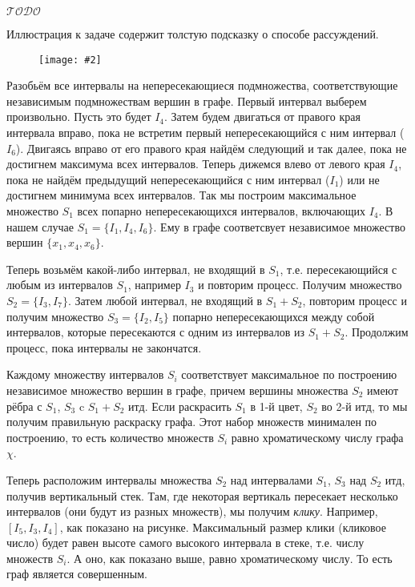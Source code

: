 \documentclass[a4paper,12pt]{article}
\numberwithin{figure}{section}
\def\TODO{\guillemotleft$\mathcal{TODO}$\guillemotright\textellipsis}
\newcommand\CenterFigure[2]{
	\begin{figure}[H]
		\centering
		\texttt{[image: \#2]}
	\end{figure}
}
\begin{document}
\begin{solution}

	\TODO

	Иллюстрация к задаче содержит толстую подсказку о способе рассуждений.
		\CenterFigure{8cm}{interval-graph-coloring--solution.png}
	Разобьём все интервалы на непересекающиеся подмножества, соответствующие независимым подмножествам вершин в графе. Первый интервал выберем произвольно. Пусть это будет $I_4$. Затем будем двигаться от правого края интервала вправо, пока не встретим первый непересекающийся с ним интервал ($I_6$). Двигаясь вправо от его правого края найдём следующий и так далее, пока не достигнем максимума всех интервалов. Теперь дижемся влево от левого края $I_4$, пока не найдём предыдущий непересекающийся с ним интервал ($I_1$) или не достигнем минимума всех интервалов. Так мы построим максимальное множество $S_1$ всех попарно непересекающихся интервалов, включающих $I_4$. В нашем случае $S_1=\{I_1,I_4,I_6\}$. Ему в графе соответсвует независимое множество вершин $\{x_1,x_4,x_6\}$.
	
	Теперь возьмём какой-либо интервал, не входящий в $S_1$, т.е. пересекающийся с любым из интервалов $S_1$, например $I_3$ и повторим процесс. Получим множество $S_2=\{I_3,I_7\}$. Затем любой интервал, не входящий в $S_1+S_2$, повторим процесс и получим множество $S_3=\{I_2,I_5\}$ попарно непересекающихся между собой интервалов, которые пересекаются с одним из интервалов из $S_1+S_2$. Продолжим процесс, пока интервалы не закончатся.
	
	Каждому множеству интервалов $S_i$ соответствует максимальное по построению независимое множество вершин в графе, причем вершины множества $S_2$ имеют рёбра с $S_1$, $S_3$ c $S_1+S_2$ итд. Если раскрасить $S_1$ в 1-й цвет, $S_2$ во 2-й итд, то мы получим правильную раскраску графа. Этот набор множеств минимален по построению, то есть количество множеств $S_i$ равно хроматическому числу графа $\chi$.
	
	Теперь расположим интервалы множества $S_2$ над интервалами $S_1$, $S_3$ над $S_2$ итд, получив вертикальный стек. Там, где некоторая вертикаль пересекает несколько интервалов (они будут из разных множеств), мы получим \textit{клику}. Например, $[I_5,I_3,I_4]$, как показано на рисунке. Максимальный размер клики (кликовое число) будет равен высоте самого высокого интервала в стеке, т.е. числу множеств $S_i$. А оно, как показано выше, равно хроматическому числу. То есть граф является совершенным.
\end{solution}
\end{document}

